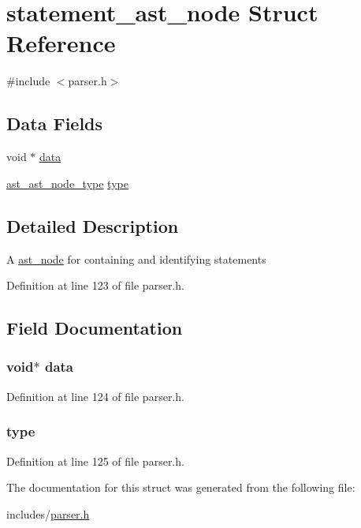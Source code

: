 \hypertarget{structstatement__ast__node}{\section{statement\+\_\+ast\+\_\+node Struct Reference}
\label{structstatement__ast__node}
}


{\ttfamily \#include $<$parser.\+h$>$}

\subsection*{Data Fields}
\begin{DoxyCompactItemize}
\item 
void $\ast$ \hyperlink{structstatement__ast__node_a735984d41155bc1032e09bece8f8d66d}{data}
\item 
\hyperlink{parser_8h_a7650f648edfc83857f6600e1898e7cac}{ast\+\_\+ast\+\_\+node\+\_\+type} \hyperlink{structstatement__ast__node_a25e8b555394f35ce17b998d5271ef1d3}{type}
\end{DoxyCompactItemize}


\subsection{Detailed Description}
A \hyperlink{structast__node}{ast\+\_\+node} for containing and identifying statements 

Definition at line 123 of file parser.\+h.



\subsection{Field Documentation}
\hypertarget{structstatement__ast__node_a735984d41155bc1032e09bece8f8d66d}{
\subsubsection[{data}]{\setlength{\rightskip}{0pt plus 5cm}void$\ast$ data}}\label{structstatement__ast__node_a735984d41155bc1032e09bece8f8d66d}


Definition at line 124 of file parser.\+h.

\hypertarget{structstatement__ast__node_a25e8b555394f35ce17b998d5271ef1d3}{
\subsubsection[{type}]{ type}}\label{structstatement__ast__node_a25e8b555394f35ce17b998d5271ef1d3}


Definition at line 125 of file parser.\+h.



The documentation for this struct was generated from the following file\+:\begin{DoxyCompactItemize}
\item 
includes/\hyperlink{parser_8h}{parser.\+h}\end{DoxyCompactItemize}
